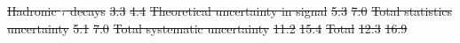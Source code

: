 \documentclass[PAPER, coverpage, atlasdraft=true, texlive=2016, UKenglish]{\ATLASLATEXPATH atlasdoc}
\providecommand{\DIFdel}[1]{{\protect\color{red}\sout{#1}}}                      %
\providecommand{\DIFdelend}{} %
\providecommand{\DIFdelFL}[1]{\DIFdel{#1}} %
\begin{document}
\DIFdelFL{Hadronic $\tau$ decays                  }%
\DIFdelFL{3.3           }%
\DIFdelFL{4.4         }%
\DIFdelFL{Theoretical uncertainty in signal       }%
\DIFdelFL{5.3           }%
\DIFdelFL{7.0         }%
\DIFdelFL{Total statistics uncertainty            }%
\DIFdelFL{5.1           }%
\DIFdelFL{7.0         }%
\DIFdelFL{Total systematic uncertainty            }%
\DIFdelFL{11.2          }%
\DIFdelFL{15.4        }%
\DIFdelFL{Total                                   }%
\DIFdelFL{12.3          }%
\DIFdelFL{16.9        }%
\DIFdelend %
\end{document}
